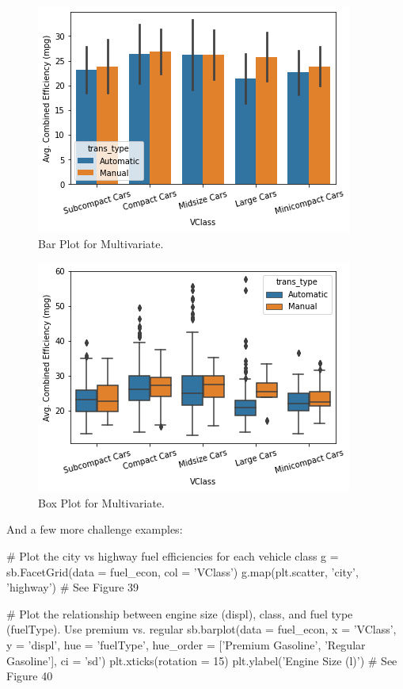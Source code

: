 \begin{figure}
	\includegraphics{images/figure37.png}
	\caption{Bar Plot for Multivariate.}\label{fig:figure37}
\end{figure}

\begin{figure}
	\includegraphics{images/figure38.png}
	\caption{Box Plot for Multivariate.}\label{fig:figure38}
\end{figure}

And a few more challenge examples:

\begin{python}
	# Plot the city vs highway fuel efficiencies for each vehicle class
	g = sb.FacetGrid(data = fuel_econ, col = 'VClass')
	g.map(plt.scatter, 'city', 'highway')
	# See Figure 39
	
	# Plot the relationship between engine size (displ), class, and fuel type (fuelType). Use premium vs. regular
	sb.barplot(data = fuel_econ, x = 'VClass', y = 'displ', hue = 'fuelType', hue_order = ['Premium Gasoline', 'Regular Gasoline'], ci = 'sd')
	plt.xticks(rotation = 15)
	plt.ylabel('Engine Size (l)')
	# See Figure 40
\end{python}

